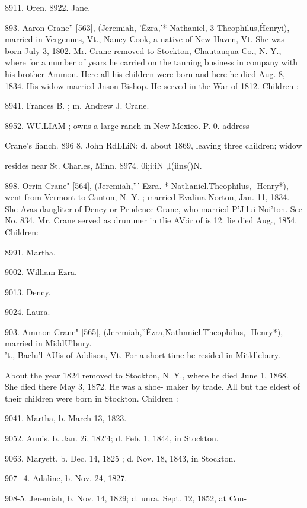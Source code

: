 \documentclass{book}
\begin{document}
8911. Oren. 
8922. Jane. 

893. Aaron Crane'' [563], (Jeremiah,-'\^ Ezra,'* Nathaniel, 3 
Theophilus,\^ Henryi), married in Vergennes, Vt., Nancy Cook, 
a native of New Haven, Vt. She was born July 3, 1802. Mr. 
Crane removed to Stockton, Chautauqua Co., N. Y., where for a 
number of years he carried on the tanning business in company 
with his brother Ammon. Here all his children were born and 
here he died Aug. 8, 1834. His widow married Jnson Bishop. 
He served in the War of 1812. Children : 

8941. Frances B. ; m. Andrew J. Crane. 

8952. WU.LIAM ; owns a large ranch in New Mexico. P. 0. address 

Crane's lianch. 
896  8. John RdLLiN; d. about 1869, leaving three children; widow 

resides near St. Charles, Minn. 
8974. 0i;i:iN ,I(iins()N. 

898. Orrin Crane" [564], (Jeremiah,''' Ezra.-* Natlianiel.\^ 
Theophilus,- Henry*), went from Vermont to Canton, N. Y. ; 
married Evaliua Norton, Jan. 11, 1834. She Avas daugliter of 
Dency or Prudence Crane, who married P'Jilui Noi'ton. See No. 
834. Mr. Crane served as drummer in tlie AV:ir of is 12. lie 
died Aug., 1854. Children: 

8991. Martha. 

9002. William Ezra. 

9013. Dency. 

9024. Laura. 

903. Ammon Crane" [565], (Jeremiah,''\^ Ezra,\^ Nathnniel.\^ 
Theophilus,- Henry*), married in MiddU'bury. \\'t., Baclu'l AUis 
of Addison, Vt. For a short time he resided in Mitldlebury. 




About the year 1824 removed to Stockton, N. Y., where he died 
June 1, 1868. She died there May 3, 1872. He was a shoe- 
maker by trade. All but the eldest of their children were born 
in Stockton. Children : 

9041. Martha, b. March 13, 1823. 

9052. Annis, b. Jan. 2i, 182'4; d. Feb. 1, 1844, in Stockton. 

 9063. Maryett, b. Dec. 14, 1825 ; d. Nov. 18, 1843, in Stockton. 

907\_4. Adaline, b. Nov. 24, 1827. 

908-5. Jeremiah, b. Nov. 14, 1829; d. unra. Sept. 12, 1852, at Con- 
\end{document}
